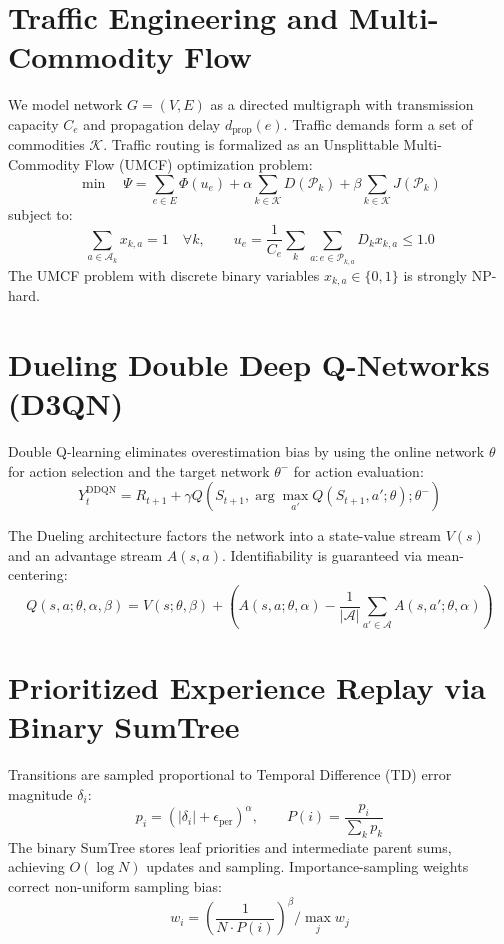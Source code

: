 \documentclass[12pt,a4paper,oneside]{report}
\begin{document}
\section{Traffic Engineering and Multi-Commodity Flow}
We model network $G = (V, E)$ as a directed multigraph with transmission capacity $C_e$ and propagation delay $d_{\text{prop}}(e)$. Traffic demands form a set of commodities $\mathcal{K}$. Traffic routing is formalized as an Unsplittable Multi-Commodity Flow (UMCF) optimization problem:
\begin{equation}
\min \quad \Psi = \sum_{e \in E} \Phi(u_e) + \alpha \sum_{k \in \mathcal{K}} D(\mathcal{P}_k) + \beta \sum_{k \in \mathcal{K}} J(\mathcal{P}_k)
\end{equation}
subject to:
\begin{equation}
\sum_{a \in \mathcal{A}_k} x_{k, a} = 1 \quad \forall k, \qquad u_e = \frac{1}{C_e} \sum_{k} \sum_{a: e \in \mathcal{P}_{k,a}} D_k x_{k,a} \le 1.0
\end{equation}
The UMCF problem with discrete binary variables $x_{k, a} \in \{0, 1\}$ is strongly NP-hard.

\section{Dueling Double Deep Q-Networks (D3QN)}
Double Q-learning eliminates overestimation bias by using the online network $\theta$ for action selection and the target network $\theta^-$ for action evaluation:
\begin{equation}
Y_t^{\text{DDQN}} = R_{t+1} + \gamma Q\left(S_{t+1}, \arg\max_{a'} Q(S_{t+1}, a'; \theta); \theta^-\right)
\end{equation}

The Dueling architecture factors the network into a state-value stream $V(s)$ and an advantage stream $A(s, a)$. Identifiability is guaranteed via mean-centering:
\begin{equation}
Q(s, a; \theta, \alpha, \beta) = V(s; \theta, \beta) + \left( A(s, a; \theta, \alpha) - \frac{1}{|\mathcal{A}|} \sum_{a' \in \mathcal{A}} A(s, a'; \theta, \alpha) \right)
\end{equation}

\section{Prioritized Experience Replay via Binary SumTree}
Transitions are sampled proportional to Temporal Difference (TD) error magnitude $\delta_i$:
\begin{equation}
p_i = (|\delta_i| + \epsilon_{\text{per}})^\alpha, \qquad P(i) = \frac{p_i}{\sum_k p_k}
\end{equation}
The binary SumTree stores leaf priorities and intermediate parent sums, achieving $O(\log N)$ updates and sampling. Importance-sampling weights correct non-uniform sampling bias:
\begin{equation}
w_i = \left( \frac{1}{N \cdot P(i)} \right)^\beta \Big/ \max_j w_j
\end{equation}
\end{document}
